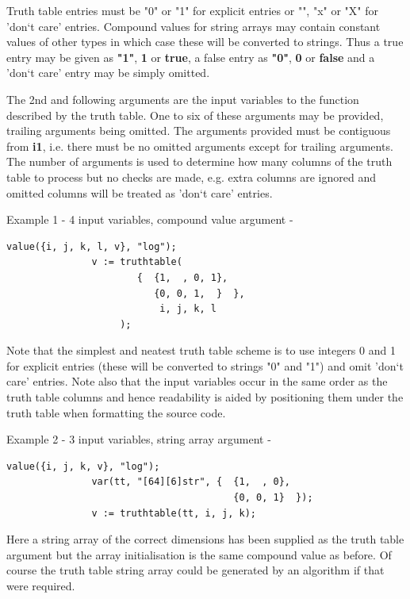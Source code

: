             Truth table entries must be "0" or "1" for explicit entries
            or "", "x" or "X" for 'don`t care' entries. Compound values
            for string arrays may contain constant values of other types
            in which case these will be converted to strings. Thus a
            true entry may be given as {\bf "1"}, {\bf 1} or {\bf true},
            a false entry as {\bf "0"}, {\bf 0} or {\bf false} and a 'don`t
            care' entry may be simply omitted.
            
            The 2nd and following arguments are the input variables to the
            function described by the truth table. One to six of these
            arguments may be provided, trailing arguments being omitted.
            The arguments provided must be contiguous from {\bf i1}, i.e.
            there must be no omitted arguments except for trailing arguments.
            The number of arguments is used to determine how many columns of the
            truth table to process but no checks are made, e.g. extra columns
            are ignored and omitted columns will be treated as 'don`t care'
            entries.
            
            Example 1 - 4 input variables, compound value argument -
            \begin{lstlisting}[gobble=12, language=threepl]
               value({i, j, k, l, v}, "log");
               v := truthtable(
                       {  {1,  , 0, 1},
                          {0, 0, 1,  }  },
                           i, j, k, l
                    );
            \end{lstlisting}
            Note that the simplest and neatest truth table scheme is to
            use integers 0 and 1 for explicit entries (these will be converted
            to strings "0" and "1") and omit 'don`t care' entries. Note also
            that the input variables occur in the same order as the truth table
            columns and hence readability is aided by positioning them under
            the truth table when formatting the source code.
            
            Example 2 - 3 input variables, string array argument -
            \begin{lstlisting}[gobble=12, language=threepl]
               value({i, j, k, v}, "log");
               var(tt, "[64][6]str", {  {1,  , 0},
                                        {0, 0, 1}  });
               v := truthtable(tt, i, j, k);
            \end{lstlisting}
            Here a string array of the correct dimensions has been supplied
            as the truth table argument but the array initialisation is the
            same compound value as before. Of course the truth table string
            array could be generated by an algorithm if that were required.
            
